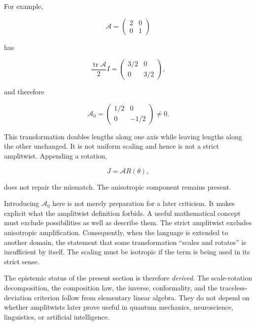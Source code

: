 \documentclass[11pt]{article}
\begin{document}
For example,

\begin{equation}
\mathcal A
=
\begin{pmatrix}
2&0\\
0&1
\end{pmatrix}
\end{equation}

has

\begin{equation}
\frac{\operatorname{tr}\mathcal A}{2}I
=
\begin{pmatrix}
3/2&0\\
0&3/2
\end{pmatrix},
\end{equation}

and therefore

\begin{equation}
\mathcal A_0
=
\begin{pmatrix}
1/2&0\\
0&-1/2
\end{pmatrix}
\neq0.
\end{equation}

This transformation doubles lengths along one axis while leaving lengths along the other unchanged. It is not uniform scaling and hence is not a strict amplitwist. Appending a rotation,

\begin{equation}
J=\mathcal A R(\theta),
\end{equation}

does not repair the mismatch. The anisotropic component remains present.

Introducing $\mathcal A_0$ here is not merely preparation for a later criticism. It makes explicit what the amplitwist definition forbids. A useful mathematical concept must exclude possibilities as well as describe them. The strict amplitwist excludes anisotropic amplification. Consequently, when the language is extended to another domain, the statement that some transformation ``scales and rotates'' is insufficient by itself. The scaling must be isotropic if the term is being used in its strict sense.

The epistemic status of the present section is therefore \emph{derived}. The scale-rotation decomposition, the composition law, the inverse, conformality, and the traceless-deviation criterion follow from elementary linear algebra. They do not depend on whether amplitwists later prove useful in quantum mechanics, neuroscience, linguistics, or artificial intelligence.
\end{document}
